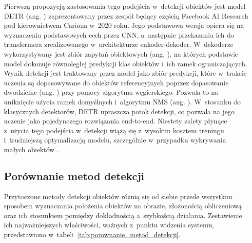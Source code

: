 Pierwszą propozycją zastosowania tego podejścia w~detekcji obiektów jest model DETR (ang. ) zaprezentowany przez zespół będący częścią Facebook AI Research pod kierownictwem Cariona w~2020 roku. Jego podstawowa wersja opiera się na wyznaczeniu podstawowych cech przez CNN, a~następnie przekazaniu ich do transformera zrealizowanego w~architekturze enkoder-dekoder. W~dekoderze wykorzystywany jest zbiór zapytań obiektowych (ang. ), na których podstawie model dokonuje równoległej predykcji klas obiektów i~ich ramek ograniczających. Wynik detekcji jest traktowany przez model jako zbiór predykcji, które w~trakcie uczenia są dopasowywane do obiektów referencyjnych poprzez dopasowanie dwudzielne (ang. ) przy pomocy algorytmu węgierskiego. Pozwala to na uniknięcie użycia ramek domyślnych i~algorytmu NMS (ang. ). W~stosunku do klasycznych detektorów, DETR upraszcza potok detekcji, co pozwala na jego uczenie jako pojedynczego rozwiązania end-to-end. Niestety zalety płynące z~użycia tego podejścia w~detekcji wiążą się z~wysokim kosztem treningu i~trudniejszą optymalizacją modelu, szczególnie w~przypadku wykrywania małych obiektów \cite{bib:carion2020endtoendobjectdetectiontransformers}.

\subsection{Porównanie metod detekcji}

Przytoczone metody detekcji obiektów różnią się od siebie przede wszystkim sposobem wyznaczania położenia obiektów na obrazie, złożonością obliczeniową oraz ich stosunkiem pomiędzy dokładnością a~szybkością działania. Zestawienie ich najważniejszych właściwości, ważnych z~punktu widzenia systemu, przedstawiono w~tabeli~\ref{tab:porownanie_metod_detekcji}.

